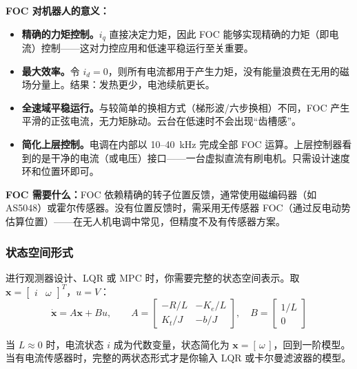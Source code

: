 \begin{mdframed}[linewidth=1pt, innertopmargin=10pt, innerbottommargin=10pt]
\textbf{FOC 对机器人的意义：}
\begin{itemize}[nosep]
    \item \textbf{精确的力矩控制。}$i_q$ 直接决定力矩，因此 FOC 能够实现精确的力矩（即电流）控制——这对力控应用和低速平稳运行至关重要。
    \item \textbf{最大效率。}令 $i_d = 0$，则所有电流都用于产生力矩，没有能量浪费在无用的磁场分量上。结果：发热更少，电池续航更长。
    \item \textbf{全速域平稳运行。}与较简单的换相方式（梯形波/六步换相）不同，FOC 产生平滑的正弦电流，无力矩脉动。云台在低速时不会出现``齿槽感''。
    \item \textbf{简化上层控制。}电调在内部以 10--40~kHz 完成全部 FOC 运算。上层控制器看到的是干净的电流（或电压）接口——一台虚拟直流有刷电机。只需设计速度环和位置环即可。
\end{itemize}

\textbf{FOC 需要什么：}FOC 依赖精确的转子位置反馈，通常使用磁编码器（如 AS5048）或霍尔传感器。没有位置反馈时，需采用无传感器 FOC（通过反电动势估算位置）——在无人机电调中常见，但精度不及有传感器方案。
\end{mdframed}

\subsubsection*{状态空间形式}

进行观测器设计、LQR 或 MPC 时，你需要完整的状态空间表示。取 $\mathbf{x} = \begin{bmatrix} i & \omega \end{bmatrix}^T$，$u = V$：
\begin{equation}
\dot{\mathbf{x}} = A\mathbf{x} + Bu, \qquad
A = \begin{bmatrix} -R/L & -K_e/L \\ K_t/J & -b/J \end{bmatrix}, \quad
B = \begin{bmatrix} 1/L \\ 0 \end{bmatrix}
\end{equation}

当 $L \approx 0$ 时，电流状态 $i$ 成为代数变量，状态简化为 $\mathbf{x} = [\,\omega\,]$，回到一阶模型。当有电流传感器时，完整的两状态形式才是你输入 LQR 或卡尔曼滤波器的模型。

